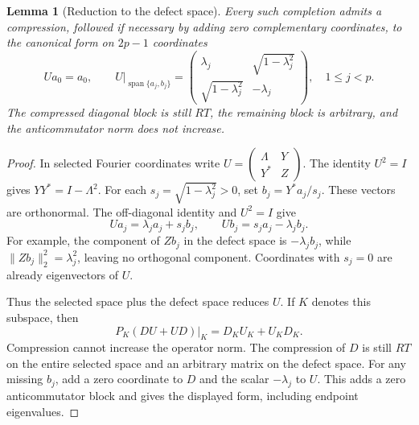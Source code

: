 \documentclass[11pt]{article}
\newtheorem{lemma}[theorem]{Lemma}
\theoremstyle{remark}
\begin{document}
\begin{lemma}[Reduction to the defect space]\label{lem:defect}
Every such completion admits a compression, followed if necessary by adding zero complementary coordinates, to the canonical form on $2p-1$ coordinates
\[
 U a_0=a_0,\qquad
 U\big|_{\operatorname{span}\{a_j,b_j\}}=
 \begin{pmatrix}\lambda_j&\sqrt{1-\lambda_j^2}\\
 \sqrt{1-\lambda_j^2}&-\lambda_j\end{pmatrix},\quad 1\le j<p.
\]
The compressed diagonal block is still $RT$, the remaining block is arbitrary, and the anticommutator norm does not increase.
\end{lemma}
\begin{proof}
In selected Fourier coordinates write $U=\left(\begin{smallmatrix}\Lambda&Y\\Y^*&Z\end{smallmatrix}\right)$. The identity $U^2=I$ gives $YY^*=I-\Lambda^2$. For each $s_j=\sqrt{1-\lambda_j^2}>0$, set $b_j=Y^*a_j/s_j$. These vectors are orthonormal. The off-diagonal identity and $U^2=I$ give
\[
 U a_j=\lambda_j a_j+s_j b_j,\qquad U b_j=s_j a_j-\lambda_j b_j.
\]
For example, the component of $Zb_j$ in the defect space is $-\lambda_jb_j$, while $\|Zb_j\|_2^2=\lambda_j^2$, leaving no orthogonal component. Coordinates with $s_j=0$ are already eigenvectors of $U$.

Thus the selected space plus the defect space reduces $U$. If $K$ denotes this subspace, then
\[
 P_K(DU+UD)|_K=D_KU_K+U_KD_K.
\]
Compression cannot increase the operator norm. The compression of $D$ is still $RT$ on the entire selected space and an arbitrary matrix on the defect space. For any missing $b_j$, add a zero coordinate to $D$ and the scalar $-\lambda_j$ to $U$. This adds a zero anticommutator block and gives the displayed form, including endpoint eigenvalues.
\end{proof}
\end{document}
